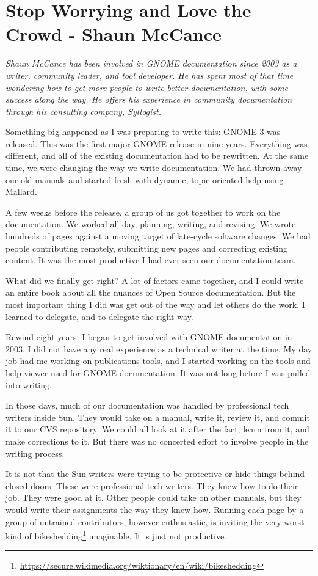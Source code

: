\chapter{Stop Worrying and Love the Crowd - Shaun McCance}

\textit{Shaun McCance has been involved in GNOME documentation since 2003
as a writer, community leader, and tool developer. He has spent
most of that time wondering how to get more people to write better
documentation, with some success along the way. He offers his
experience in community documentation through his consulting
company, Syllogist.}

Something big happened as I was preparing to write this: GNOME 3 was released.
This was the first major GNOME release in nine years. Everything was different,
and all of the existing documentation had to be rewritten. At the same time, we
were changing the way we write documentation. We had thrown away our old manuals
and started fresh with dynamic, topic-oriented help using Mallard.

A few weeks before the release, a group of us got together to work on the
documentation. We worked all day, planning, writing, and revising. We wrote
hundreds of pages against a moving target of late-cycle software changes. We
had people contributing remotely, submitting new pages and correcting existing
content. It was the most productive I had ever seen our documentation team.

What did we finally get right? A lot of factors came together, and I could
write an entire book about all the nuances of Open Source documentation.
But the most important thing I did was get out of the way and let others
do the work. I learned to delegate, and to delegate the right way.

Rewind eight years. I began to get involved with GNOME documentation in 2003.
I did not have any real experience as a technical writer at the time. My day
job had me working on publications tools, and I started working on the tools
and help viewer used for GNOME documentation. It was not long before I was
pulled into writing.

In those days, much of our documentation was handled by professional tech
writers inside Sun. They would take on a manual, write it, review it, and
commit it to our CVS repository. We could all look at it after the fact,
learn from it, and make corrections to it. But there was no concerted
effort to involve people in the writing process.

It is not that the Sun writers were trying to be protective or hide things
behind closed doors. These were professional tech writers. They knew how
to do their job. They were good at it. Other people could take on other
manuals, but they would write their assignments the way they knew how.
Running each page by a group of untrained contributors, however
enthusiastic, is inviting the very worst kind of bikeshedding\footnote{\url{https://secure.wikimedia.org/wiktionary/en/wiki/bikeshedding}}
imaginable. It is just not productive.

